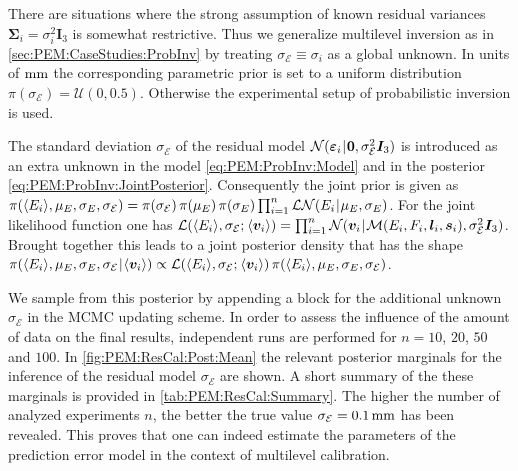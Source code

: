 There are situations where the strong assumption of known residual variances \(\bm{\Sigma}_i = \sigma_i^2 \bm{I}_3\) is somewhat restrictive.
Thus we generalize multilevel inversion as in \cref{sec:PEM:CaseStudies:ProbInv} by treating \(\sigma_{\mathcal{E}} \equiv \sigma_i\) as a global unknown.
In units of \(\unit[]{mm}\) the corresponding parametric prior is set to a uniform distribution \(\pi(\sigma_{\mathcal{E}}) = \mathcal{U}(0,0.5)\).
Otherwise the experimental setup of probabilistic inversion is used.
\par %
The standard deviation \(\sigma_{\mathcal{E}}\) of the residual model \(\mathcal{N}(\bm{\varepsilon}_i {\:\!}|{\:\!} \bm{0},\sigma_{\mathcal{E}}^2 \bm{I}_3)\)
is introduced as an extra unknown in the model \cref{eq:PEM:ProbInv:Model} and in the posterior \cref{eq:PEM:ProbInv:JointPosterior}.
Consequently the joint prior is given as \(\pi(\langle{E_i}\rangle,\mu_E,\sigma_E,\sigma_{\mathcal{E}}) = \pi(\sigma_{\mathcal{E}}) \, \pi(\mu_E) \, \pi(\sigma_E) \prod_{i=1}^n \mathcal{LN}(E_i {\:\!}|{\:\!} \mu_E,\sigma_E)\).
For the joint likelihood function one has \(\mathcal{L}(\langle{E_i}\rangle,\sigma_{\mathcal{E}} ;{\:\!} \langle{\bm{v}_i}\rangle) = \prod_{i=1}^n \mathcal{N}(\bm{v}_i \allowbreak {\:\!}|{\:\!} \mathcal{M}(E_i,F_i,\bm{l}_i,\bm{s}_i),\sigma_{\mathcal{E}}^2 \bm{I}_3)\).
Brought together this leads to a joint posterior density that has the shape
\(\pi(\langle{E_i}\rangle,\mu_E,\sigma_E, \allowbreak \sigma_{\mathcal{E}} {\:\!}|{\:\!} \langle{\bm{v}_i}\rangle) \propto \mathcal{L}(\langle{E_i}\rangle,\sigma_{\mathcal{E}} ;{\:\!} \langle{\bm{v}_i}\rangle) \, \pi(\langle{E_i}\rangle,\mu_E,\sigma_E,\sigma_{\mathcal{E}})\).
\par %
We sample from this posterior by appending a block for the additional unknown \(\sigma_{\mathcal{E}}\) in the MCMC updating scheme.
In order to assess the influence of the amount of data on the final results, independent runs are performed for \(n = 10\), \(20\), \(50\) and \(100\).
In \cref{fig:PEM:ResCal:Post:Mean} the relevant posterior marginals for the inference of the residual model \(\sigma_{\mathcal{E}}\) are shown.
A short summary of the these marginals is provided in \cref{tab:PEM:ResCal:Summary}.
The higher the number of analyzed experiments \(n\), the better the true value \(\sigma_{\mathcal{E}} = \unit[0.1]{mm}\) has been revealed.
This proves that one can indeed estimate the parameters of the prediction error model in the context of multilevel calibration.
